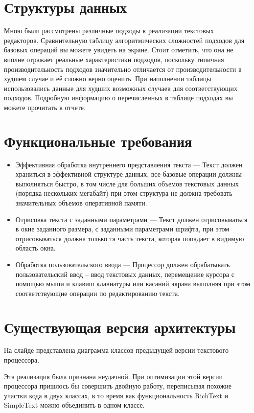 \documentclass{article}
\begin{document}
    \section{Структуры данных}
        \par Мною были рассмотрены различные подходы к реализации текстовых редакторов. 
        Сравнительную таблицу алгоритмических сложностей подходов для базовых операций вы 
        можете увидеть на экране. Стоит отметить, что она не вполне отражает реальные 
        характеристики подходов, поскольку типичная производительность подходов значительно 
        отличается от производительности в худшем случае и её сложно верно оценить. При 
        наполнении таблицы использовались данные для худших возможных случаев для 
        соответствующих подходов. Подробную информацию о перечисленных в таблице подходах вы 
        можете прочитать в отчете.
    \section{Функциональные требования}
        \begin{itemize}
            \item Эффективная обработка внутреннего представления текста ---
            Текст должен храниться в эффективной структуре данных, все базовые операции должны 
            выполняться быстро, в том числе для больших объемов текстовых данных (порядка 
            нескольких мегабайт) при этом структура не должна требовать значительных объемов 
            оперативной памяти.
            \item Отрисовка текста с заданными параметрами --- Текст должен отрисовываться в 
            окне заданного размера, с заданными параметрами шрифта, при этом отрисовываться 
            должна только та часть текста, которая попадает в видимую область окна.
            \item Обработка пользовательского ввода --- Процессор должен обрабатывать 
            пользовательский ввод – ввод текстовых данных, перемещение курсора с помощью мыши и 
            клавиш клавиатуры или касаний экрана выполняя при этом соответствующие операции по 
            редактированию текста.
        \end{itemize}
    \section{Существующая версия архитектуры}
        \par На слайде представлена диаграмма классов предыдущей версии текстового процессора.
        \par Эта реализация была признана неудачной. При оптимизации этой версии процессора 
        пришлось бы совершить двойную работу, переписывая похожие участки кода в двух классах, 
        в то время как функциональность RichText и SimpleText можно объединить в одном классе.
\end{document}
